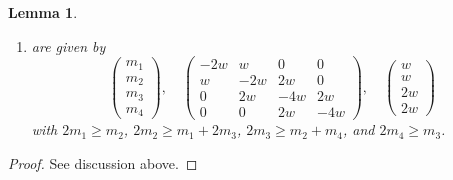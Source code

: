 \documentclass{stacks-project}
\theoremstyle{plain}
\newtheorem{lemma}[subsection]{Lemma}
\theoremstyle{definition}
\theoremstyle{remark}
\numberwithin{equation}{subsection}
\begin{document}
\begin{lemma}
\begin{enumerate}
$$\begin{matrix}
m_1 \\
m_2 \\
m_3 \\
m_4
\end{matrix}
\right),
\quad
\left(
\begin{matrix}
-4w & 2w & 0 & 0 \\
2w & -4w & 2w & 0 \\
0 & 2w & -4w & 2w \\
0 & 0 & 2w & -2w 
\end{matrix}
\right),
\quad
\left(
\begin{matrix}
2w \\
2w \\
2w \\
w
\end{matrix}
\right)
$$
with $2m_1 \geq m_2$, $2m_2 \geq m_1 + m_3$, $2m_3 \geq m_2 + m_4$,
and $m_4 \geq m_3$, or
\item
\label{item-F4}
are given by
$$
\left(
\begin{matrix}
m_1 \\
m_2 \\
m_3 \\
m_4
\end{matrix}
\right),
\quad
\left(
\begin{matrix}
-2w & w & 0 & 0 \\
w & -2w & 2w & 0 \\
0 & 2w & -4w & 2w \\
0 & 0 & 2w & -4w 
\end{matrix}
\right),
\quad
\left(
\begin{matrix}
w \\
w \\
2w \\
2w
\end{matrix}
\right)
$$
with $2m_1 \geq m_2$, $2m_2 \geq m_1 + 2m_3$, $2m_3 \geq m_2 + m_4$,
and $2m_4 \geq m_3$.
\end{enumerate}
\end{lemma}

\begin{proof}
See discussion above.
\end{proof}
\end{document}
